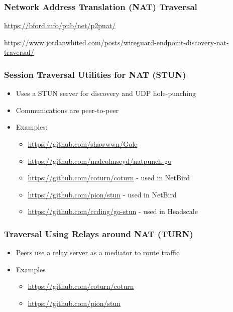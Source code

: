 \subsubsection{Network Address Translation (NAT) Traversal}\label{notes__02021-internet-protocol.md__network-address-translation-nat-traversal}

\url{https://bford.info/pub/net/p2pnat/}

\url{https://www.jordanwhited.com/posts/wireguard-endpoint-discovery-nat-traversal/}

\subsubsection{Session Traversal Utilities for NAT (STUN)}\label{notes__02021-internet-protocol.md__session-traversal-utilities-for-nat-stun}

\begin{itemize}
\item
  Uses a STUN server for discovery and UDP hole-punching
\item
  Communications are peer-to-peer
\item
  Examples:

  \begin{itemize}
  \item
    \url{https://github.com/shawwwn/Gole}
  \item
    \url{https://github.com/malcolmseyd/natpunch-go}
  \item
    \url{https://github.com/coturn/coturn} - used in NetBird
  \item
    \url{https://github.com/pion/stun} - used in NetBird
  \item
    \url{https://github.com/ccding/go-stun} - used in Headscale
  \end{itemize}
\end{itemize}

\subsubsection{Traversal Using Relays around NAT (TURN)}\label{notes__02021-internet-protocol.md__traversal-using-relays-around-nat-turn}

\begin{itemize}
\item
  Peers use a relay server as a mediator to route traffic
\item
  Examples

  \begin{itemize}
  \item
    \url{https://github.com/coturn/coturn}
  \item
    \url{https://github.com/pion/stun}
  \end{itemize}
\end{itemize}

